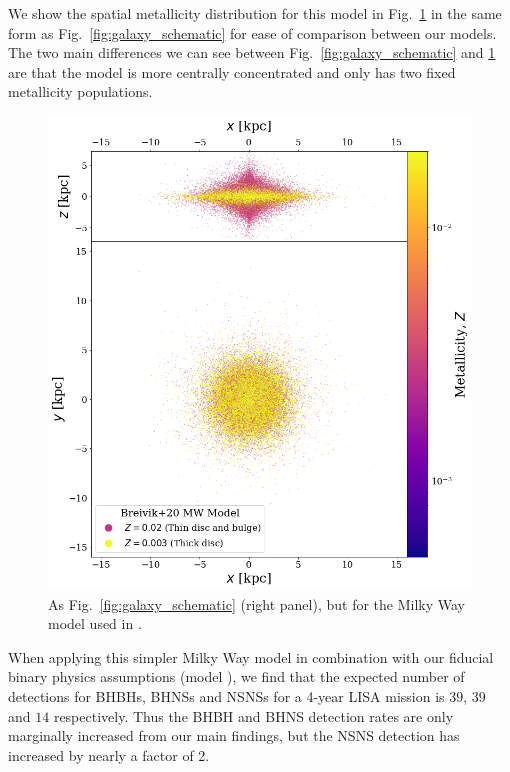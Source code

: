 We show the spatial metallicity distribution for this model in Fig.~\ref{fig:simple_mw} in the same form as Fig.~\ref{fig:galaxy_schematic} for ease of comparison between our models. The two main differences we can see between Fig.~\ref{fig:galaxy_schematic} and \ref{fig:simple_mw} are that the \citet{Breivik+2020} model is more centrally concentrated and only has two fixed metallicity populations.

\begin{figure}[ht]
    \centering
    \includegraphics[width=\columnwidth]{../figures/random_simple_galaxy.png}
    \caption{As Fig.~\ref{fig:galaxy_schematic} (right panel), but for the Milky Way model used in \citet{Breivik+2020}.}
    \label{fig:simple_mw}
\end{figure}

When applying this simpler Milky Way model in combination with our fiducial binary physics assumptions (model \modFid{}), we find that the expected number of detections for BHBHs, BHNSs and NSNSs for a 4-year LISA mission is $39$, $39$ and $14$ respectively. Thus the BHBH and BHNS detection rates are only marginally increased from our main findings, but the NSNS detection has increased by nearly a factor of 2.

